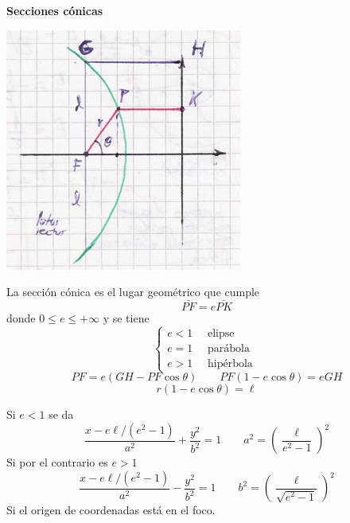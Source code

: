 \documentclass[10pt,oneside]{CBFT_book}
\begin{document}
\begin{ejemplo}{\bf Secciones cónicas}
 
\includegraphics[scale=0.3]{images/fig_mc_secciones_conicas.jpg} 
 
La sección cónica es el lugar geométrico que cumple 
\[
	\bar{PF} = e \bar{PK}
\]
donde $0 \leq e \leq +\infty$ y se tiene
\[
	\begin{cases}
	e < 1 \quad \text{ elipse } \\
	e = 1 \quad \text{ parábola } \\
	e > 1 \quad \text{ hipérbola }
	\end{cases}
\]
\[
	PF = e (GH - PF \cos\theta ) \qquad PF(1-e\cos\theta) = e GH
\]
\[
	r(1-e\cos\theta)=\ell
\]

Si $e<1$ se da
\[
	\frac{ x - e\ell/(e^2-1)}{a^2} + \frac{y^2}{b^2}= 1 \qquad a^2 = \left( \frac{\ell}{e^2-1} \right)^2 
\]
Si por el contrario es $e>1$
\[
	\frac{ x - e\ell/(e^2-1)}{a^2} - \frac{y^2}{b^2}= 1 \qquad b^2 = \left( \frac{\ell}{\sqrt{e^2-1}} \right)^2 
\]
Si el origen de coordenadas está en el foco.
\end{ejemplo}


% 

\end{document}
